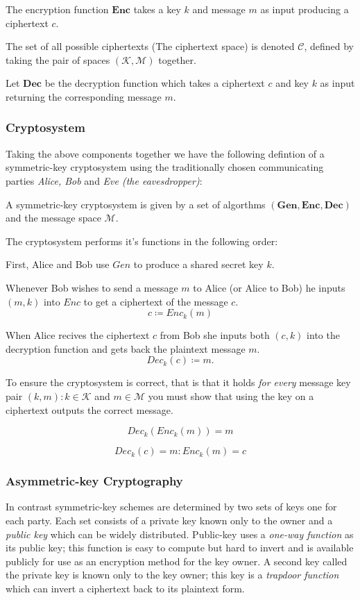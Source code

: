 The encryption function $\mathbf{{Enc}}$ takes a key $k$ and message $m$ as input producing a ciphertext $c$.


The set of all possible ciphertexts (The ciphertext space) is denoted $\mathbf{\mathcal{C}}$, defined by taking the pair of spaces $\mathbf{(\mathcal{K}, \mathcal{M})}$ together. 


Let $\mathbf{Dec}$ be the decryption function which takes a ciphertext $c$ and key $k$ as input returning the corresponding message $m$.


\subsubsection*{Cryptosystem}


Taking the above components together we have the following defintion of a symmetric-key cryptosystem using the traditionally chosen communicating parties \emph{Alice, Bob} and \emph{Eve (the eavesdropper)}:


A symmetric-key cryptosystem is given by a set of algorthms $\mathbf{(Gen, Enc, Dec)}$ and the message space $\mathcal{M}$.

The cryptosystem performs it's functions in the following order:

First, Alice and Bob use $Gen$ to produce a shared secret key $k$.

Whenever Bob wishes to send a message $m$ to Alice (or Alice to Bob) he inputs $(m,k)$ into $Enc$ to get a ciphertext of the message $c$.
\[c \coloneqq Enc_{k}(m)\]

When Alice recives the ciphertext $c$ from Bob she inputs both $(c,k)$ into the decryption function and gets back the plaintext message $m$.
\[Dec_{k}(c) \coloneqq m.\]

To ensure the cryptosystem is correct, that is that it holds \textit{for every} message key pair $(k,m) : k \in \mathcal{K}$ and $m \in \mathcal{M}$ you must show that using the key on a ciphertext outputs the correct message. 

\[Dec_{k}(Enc_{k}(m)) = m\]

\[Dec_{k}(c) = m : Enc_{k}(m) = c\]



\subsubsection*{Asymmetric-key Cryptography}
In contrast symmetric-key schemes are determined by two sets of keys one for each party. Each set consists of a private key known only to the owner and a \emph{public key} which can be widely distributed.
Public-key uses a \emph{one-way function} as its public key; this function is easy to compute but hard to invert and is available publicly for use as an encryption method for the key owner. A second key called the private key is known only to the key owner; this key is a \emph{trapdoor function} which can invert a ciphertext back to its plaintext form.

